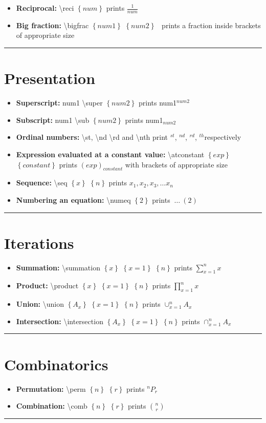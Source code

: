 \documentclass[12pt]{article}
\newcommand{\esc}{\textbackslash}
\newcommand{\braces}[1]{\ensuremath{\left\lbrace #1 \right\rbrace}}
\newcommand{\bigbrac}[1]{\ensuremath{\left( #1 \right)}}
\newcommand{\reci}[1]{\ensuremath{\displaystyle\frac{1}{#1}}}
\newcommand{\super}[1]{\ensuremath{^{#1}}}
\newcommand{\sub}[1]{\ensuremath{_{#1}}}
\newcommand{\st}{\ensuremath{^{st}}}
\newcommand{\nd}{\ensuremath{^{nd}}}
\newcommand{\rd}{\ensuremath{^{rd}}}
\newcommand{\nth}{\ensuremath{^{th}}}
\newcommand{\atconstant}[2]{\ensuremath{\bigbrac{#1}_{#2}}}
\newcommand{\seq}[2]{\ensuremath{#1_1, #1_2, #1_3, \dots #1_{#2}}}
\newcommand{\numeq}[1]{\ensuremath{ \ \dots \ (#1)}}
\newcommand{\summation}[3]{\ensuremath{\sum\limits_{#2}^{#3} #1}}
\newcommand{\product}[3]{\ensuremath{\prod\limits_{#2}^{#3} #1}}
\newcommand{\union}[3]{\ensuremath{\cup_{#2}^{#3} #1}}
\newcommand{\intersection}[3]{\ensuremath{\cap_{#2}^{#3} #1}}
\newcommand{\perm}[2]{\ensuremath{ ^{#1}P _{#2}}}
\newcommand{\comb}[2]{\ensuremath{{#1 \choose #2}}}
\newcommand{\drawline}{\vspace{5mm}\hrule}
\newcommand{\point}[1]{\item\textbf{#1:}}
\begin{document}
\begin{itemize}

\point{Reciprocal} \esc reci \braces{num} prints \reci{num}
\point{Big fraction} \esc bigfrac \braces{num1} \braces{num2} \ prints a fraction inside brackets of appropriate size

\end{itemize}
\drawline

\section{Presentation}

\begin{itemize}

\point{Superscript} num1 \esc super \braces{num2} prints num1\super{num2}
\point{Subscript} num1 \esc sub \braces{num2} prints num1\sub{num2}
\point{Ordinal numbers} \esc st, \esc nd \esc rd and \esc nth print \st, \nd, \rd, \nth respectively
\point{Expression evaluated at a constant value} \esc atconstant \braces{exp} \braces{constant} prints \atconstant{exp}{constant} with brackets of appropriate size
\point{Sequence} \esc seq \braces{x} \braces{n} prints \seq{x}{n}
\point{Numbering an equation} \esc numeq \braces{2} prints \numeq{2} 

\end{itemize}
\drawline

\section{Iterations}

\begin{itemize}

\point{Summation} \esc summation \braces{x} \braces{x=1} \braces{n} prints \summation{x}{x=1}{n}
\point{Product} \esc product \braces{x} \braces{x=1} \braces{n} prints \product{x}{x=1}{n}
\point{Union} \esc union \braces{A_x} \braces{x=1} \braces{n} prints \union{A_x}{x=1}{n}
\point{Intersection} \esc intersection \braces{A_x} \braces{x=1} \braces{n} prints \intersection{A_x}{x=1}{n}

\end{itemize}
\drawline

\section{Combinatorics}

\begin{itemize}

\point{Permutation} \esc perm \braces{n} \braces{r} prints \perm{n}{r}
\point{Combination} \esc comb \braces{n} \braces{r} prints \comb{n}{r}

\end{itemize}
\drawline
\end{document}
